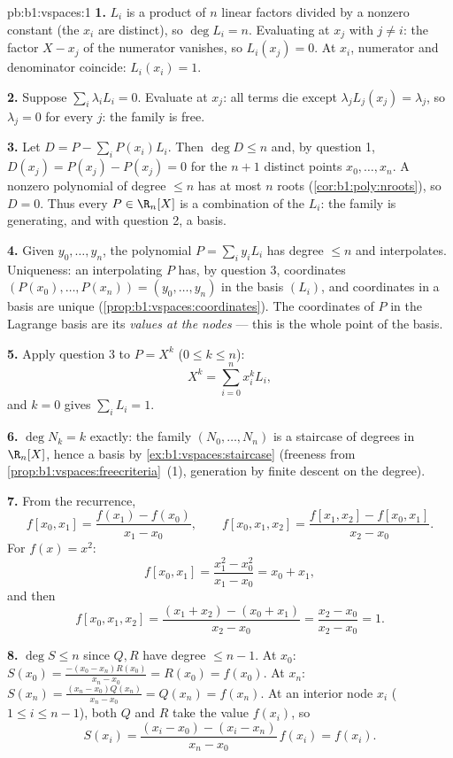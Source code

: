 \begin{solution}{pb:b1:vspaces:1}
\textbf{1.} $L_i$ is a product of $n$ linear factors divided by a
nonzero constant (the $x_i$ are distinct), so $\deg L_i = n$.
Evaluating at $x_j$ with $j \neq i$: the factor $X - x_j$ of the
numerator vanishes, so $L_i(x_j) = 0$. At $x_i$, numerator and
denominator coincide: $L_i(x_i) = 1$.

\textbf{2.} Suppose $\sum_i \lambda_i L_i = 0$. Evaluate at $x_j$:
all terms die except $\lambda_j L_j(x_j) = \lambda_j$, so
$\lambda_j = 0$ for every $j$: the family is free.

\textbf{3.} Let $D = P - \sum_i P(x_i) L_i$. Then $\deg D \leq n$
and, by question 1, $D(x_j) = P(x_j) - P(x_j) = 0$ for the $n + 1$
distinct points $x_0, \dots, x_n$. A nonzero polynomial of degree
$\leq n$ has at most $n$ roots (\cref{cor:b1:poly:nroots}), so $D
= 0$. Thus every $P \in \R_n[X]$ is a combination of the $L_i$:
the family is generating, and with question 2, a basis.

\textbf{4.} Given $y_0, \dots, y_n$, the polynomial $P = \sum_i
y_i L_i$ has degree $\leq n$ and interpolates. Uniqueness: an
interpolating $P$ has, by question 3, coordinates $(P(x_0), \dots,
P(x_n)) = (y_0, \dots, y_n)$ in the basis $(L_i)$, and coordinates
in a basis are unique (\cref{prop:b1:vspaces:coordinates}). The
coordinates of $P$ in the Lagrange basis are its \emph{values at
the nodes} --- this is the whole point of the basis.

\textbf{5.} Apply question 3 to $P = X^k$ ($0 \leq k \leq n$):
\[
X^k = \sum_{i=0}^{n} x_i^{k} L_i ,
\]
and $k = 0$ gives $\sum_i L_i = 1$.

\textbf{6.} $\deg N_k = k$ exactly: the family $(N_0, \dots, N_n)$
is a staircase of degrees in $\R_n[X]$, hence a basis by
\cref{ex:b1:vspaces:staircase} (freeness from
\cref{prop:b1:vspaces:freecriteria}~(1), generation by finite
descent on the degree).

\textbf{7.} From the recurrence,
\[
f[x_0, x_1] = \frac{f(x_1) - f(x_0)}{x_1 - x_0},
\qquad
f[x_0, x_1, x_2] = \frac{f[x_1, x_2] - f[x_0, x_1]}{x_2 - x_0}.
\]
For $f(x) = x^2$:
\[
f[x_0, x_1] = \frac{x_1^2 - x_0^2}{x_1 - x_0} = x_0 + x_1,
\]
and then
\[
f[x_0, x_1, x_2]
= \frac{(x_1 + x_2) - (x_0 + x_1)}{x_2 - x_0}
= \frac{x_2 - x_0}{x_2 - x_0} = 1 .
\]

\textbf{8.} $\deg S \leq n$ since $Q, R$ have degree $\leq n - 1$.
At $x_0$: $S(x_0) = \frac{-(x_0 - x_n) R(x_0)}{x_n - x_0} =
R(x_0) = f(x_0)$. At $x_n$: $S(x_n) = \frac{(x_n - x_0)
Q(x_n)}{x_n - x_0} = Q(x_n) = f(x_n)$. At an interior node $x_i$
($1 \leq i \leq n-1$), both $Q$ and $R$ take the value $f(x_i)$,
so
\[
S(x_i) = \frac{(x_i - x_0) - (x_i - x_n)}{x_n - x_0}\, f(x_i)
= f(x_i) .
\]


\end{solution}
